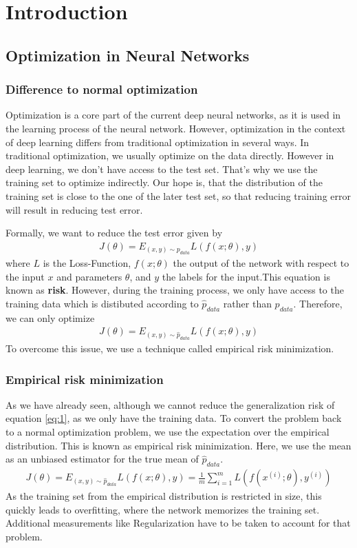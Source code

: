 \chapter{Introduction}
\section{Optimization in Neural Networks}
\subsection{Difference to normal optimization}\label{sub:1}
Optimization is a core part of the current deep neural networks, as it is used
in the learning process of the neural network. However, optimization in the
context of deep learning differs from  traditional optimization in several ways.
In traditional optimization, we usually optimize on the data directly. However
in deep learning, we don't have access to the test set. That's why we use the
training set to optimize indirectly. Our hope is, that the distribution of the
training set is close to the one of the later test set, so that reducing
training error will result in reducing test error.

Formally, we want to reduce the test error given by
\begin{align}\label{eq:1}
    J(\theta) = E_{(x,y)\sim p_{data}} L(f(x;\theta), y)
\end{align}
where $L$ is the Loss-Function, $f(x;\theta)$ the output of the network with
respect to the input $x$ and parameters $\theta$, and $y$ the labels for the
input.This equation is known as \textbf{risk}. However, during the training
process, we only have access to the training data which is distibuted according 
to $\hat{p}_{data}$ rather than $p_{data}$. Therefore, we can only optimize
\begin{align}
    J(\theta) = E_{(x,y)\sim \hat{p}_{data}} L(f(x;\theta), y)
\end{align}
To overcome this issue, we use a technique called empirical risk minimization.

\subsection{Empirical risk minimization}\label{sub:2} As we have already seen,
although we cannot reduce the generalization risk of equation \ref{eq:1}, as we
only have the training data. To convert the problem back to a normal
optimization problem, we use the expectation over the empirical distribution.
This is known as empirical risk minimization. Here, we use the mean as an
unbiased estimator for the true mean of $\hat{p}_{data}$.
\begin{align}\label{eq:3}
    J(\theta) = E_{(x,y)\sim \hat{p}_{data}} L(f(x;\theta), y) = \frac{1}{m} \sum_{i=1}^m L(f(x^{(i)}; \theta), y^{(i)})
\end{align}
As the training set from the empirical distribution is restricted in size, this
quickly leads to overfitting, where the network memorizes the training set.
Additional measurements like Regularization have to be taken to account for that
problem.

